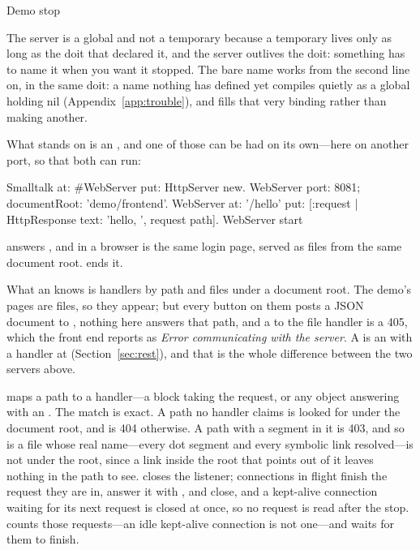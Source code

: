 \begin{st}
Demo stop
\end{st}

The server is a global and not a  temporary because a
temporary lives only as long as the doit that declared it, and the
server outlives the doit: something has to name it when you want it
stopped. The bare name works from the second line on, in the same doit: a
name nothing has defined yet compiles quietly as a global holding nil
(Appendix~\ref{app:trouble}), and  fills that very
binding rather than making another.

What  stands on is an , and one of those can
be had on its own---here on another port, so that both can run:

\begin{st}
Smalltalk at: #WebServer put: HttpServer new.
WebServer port: 8081; documentRoot: 'demo/frontend'.
WebServer at: '/hello' put: [:request | HttpResponse text: 'hello, ', request path].
WebServer start
\end{st}

 answers , and
 in a browser is the same login page, served as
files from the same document root.  ends it.

\begin{stwarn}
What an  knows is handlers by path and files under a document
root. The demo's pages are files, so they appear; but every button on them
posts a JSON document to , nothing here answers that path, and a
 to the file handler is a 405, which the front end reports as
\emph{Error communicating with the server}. A  is an
 with a handler at  (Section~\ref{sec:rest}), and
that is the whole difference between the two servers above.
\end{stwarn}

 maps a path to a handler---a block taking the request, or any
object answering  with an . The match is exact.
A path no handler claims is looked for under the document root, and is 404
otherwise. A path with a  segment in it is 403, and so is a file whose
real name---every dot segment and every symbolic link resolved---is not under
the root, since a link inside the root that points out of it leaves nothing in
the path to see.  closes the listener; connections in flight finish
the request they are in, answer it with , and close,
and a kept-alive connection waiting for its next request is closed at once,
so no request is read after the stop.
 counts those requests---an idle kept-alive connection
is not one---and  waits for them to finish.

